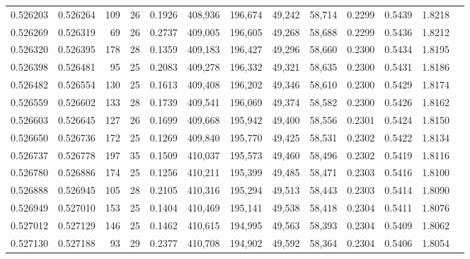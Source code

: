 \begin{tabular}{rrrrrrrrrrrrr}
0.526203 & 0.526264 & 109 &  26 &                                     0.1926 & 408,936 & 196,674 &  49,242 &  58,714 & 0.2299 & 0.5439 & 1.8218 \\
0.526269 & 0.526319 &  69 &  26 &                                     0.2737 & 409,005 & 196,605 &  49,268 &  58,688 & 0.2299 & 0.5436 & 1.8212 \\
0.526320 & 0.526395 & 178 &  28 &                                     0.1359 & 409,183 & 196,427 &  49,296 &  58,660 & 0.2300 & 0.5434 & 1.8195 \\
0.526398 & 0.526481 &  95 &  25 &                                     0.2083 & 409,278 & 196,332 &  49,321 &  58,635 & 0.2300 & 0.5431 & 1.8186 \\
0.526482 & 0.526554 & 130 &  25 &                                     0.1613 & 409,408 & 196,202 &  49,346 &  58,610 & 0.2300 & 0.5429 & 1.8174 \\
0.526559 & 0.526602 & 133 &  28 &                                     0.1739 & 409,541 & 196,069 &  49,374 &  58,582 & 0.2300 & 0.5426 & 1.8162 \\
0.526603 & 0.526645 & 127 &  26 &                                     0.1699 & 409,668 & 195,942 &  49,400 &  58,556 & 0.2301 & 0.5424 & 1.8150 \\
0.526650 & 0.526736 & 172 &  25 &                                     0.1269 & 409,840 & 195,770 &  49,425 &  58,531 & 0.2302 & 0.5422 & 1.8134 \\
0.526737 & 0.526778 & 197 &  35 &                                     0.1509 & 410,037 & 195,573 &  49,460 &  58,496 & 0.2302 & 0.5419 & 1.8116 \\
0.526780 & 0.526886 & 174 &  25 &                                     0.1256 & 410,211 & 195,399 &  49,485 &  58,471 & 0.2303 & 0.5416 & 1.8100 \\
0.526888 & 0.526945 & 105 &  28 &                                     0.2105 & 410,316 & 195,294 &  49,513 &  58,443 & 0.2303 & 0.5414 & 1.8090 \\
0.526949 & 0.527010 & 153 &  25 &                                     0.1404 & 410,469 & 195,141 &  49,538 &  58,418 & 0.2304 & 0.5411 & 1.8076 \\
0.527012 & 0.527129 & 146 &  25 &                                     0.1462 & 410,615 & 194,995 &  49,563 &  58,393 & 0.2304 & 0.5409 & 1.8062 \\
0.527130 & 0.527188 &  93 &  29 &                                     0.2377 & 410,708 & 194,902 &  49,592 &  58,364 & 0.2304 & 0.5406 & 1.8054 \\

\end{tabular}
